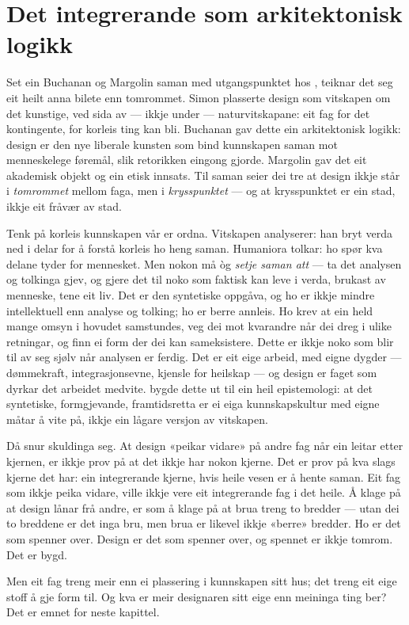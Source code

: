 \section{Det integrerande som arkitektonisk logikk}

Set ein Buchanan og Margolin saman med utgangspunktet hos \textcite{simon1969sciences}, teiknar det seg eit heilt anna bilete enn tomrommet. Simon plasserte design som vitskapen om det kunstige, ved sida av — ikkje under — naturvitskapane: eit fag for det kontingente, for korleis ting kan bli. Buchanan gav dette ein arkitektonisk logikk: design er den nye liberale kunsten som bind kunnskapen saman mot menneskelege føremål, slik retorikken eingong gjorde. Margolin gav det eit akademisk objekt og ein etisk innsats. Til saman seier dei tre at design ikkje står i \emph{tomrommet} mellom faga, men i \emph{krysspunktet} — og at krysspunktet er ein stad, ikkje eit fråvær av stad.

Tenk på korleis kunnskapen vår er ordna. Vitskapen analyserer: han bryt verda ned i delar for å forstå korleis ho heng saman. Humaniora tolkar: ho spør kva delane tyder for mennesket. Men nokon må òg \emph{setje saman att} — ta det analysen og tolkinga gjev, og gjere det til noko som faktisk kan leve i verda, brukast av menneske, tene eit liv. Det er den syntetiske oppgåva, og ho er ikkje mindre intellektuell enn analyse og tolking; ho er berre annleis. Ho krev at ein held mange omsyn i hovudet samstundes, veg dei mot kvarandre når dei dreg i ulike retningar, og finn ei form der dei kan sameksistere. Dette er ikkje noko som blir til av seg sjølv når analysen er ferdig. Det er eit eige arbeid, med eigne dygder — dømmekraft, integrasjonsevne, kjensle for heilskap — og design er faget som dyrkar det arbeidet medvite. \textcite{cross2006} bygde dette ut til ein heil epistemologi: at det syntetiske, formgjevande, framtidsretta er ei eiga kunnskapskultur med eigne måtar å vite på, ikkje ein lågare versjon av vitskapen.

Då snur skuldinga seg. At design «peikar vidare» på andre fag når ein leitar etter kjernen, er ikkje prov på at det ikkje har nokon kjerne. Det er prov på kva slags kjerne det har: ein integrerande kjerne, hvis heile vesen er å hente saman. Eit fag som ikkje peika vidare, ville ikkje vere eit integrerande fag i det heile. Å klage på at design lånar frå andre, er som å klage på at brua treng to bredder — utan dei to breddene er det inga bru, men brua er likevel ikkje «berre» bredder. Ho er det som spenner over. Design er det som spenner over, og spennet er ikkje tomrom. Det er bygd.

\vignett

Men eit fag treng meir enn ei plassering i kunnskapen sitt hus; det treng eit eige stoff å gje form til. Og kva er meir designaren sitt eige enn meininga ting ber? Det er emnet for neste kapittel.

